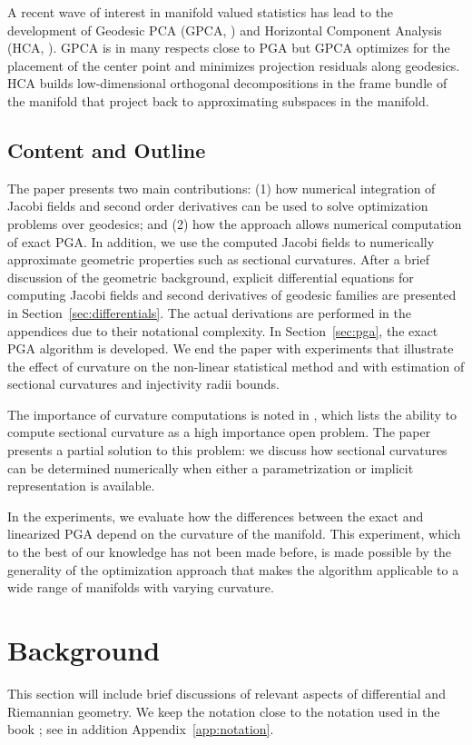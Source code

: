 \documentclass[final]{svjour3}
\begin{document}
A recent wave of interest in manifold valued statistics 
has lead to the development of Geodesic PCA (GPCA, 
\cite{huckemann_intrinsic_2010})
and Horizontal Component Analysis (HCA, \cite{sommer_horizontal_2013}).
GPCA is in many respects close to PGA but
GPCA optimizes for the placement of the center point
and minimizes projection residuals along geodesics. HCA builds low-dimensional orthogonal
decompositions in the frame bundle of the manifold that project back to
approximating subspaces in the manifold.

\subsection{Content and Outline}
The paper presents two main contributions: (1) how numerical integration of 
Jacobi fields and second order derivatives can be used to solve optimization problems over
geodesics; and (2) how the approach allows numerical computation of exact PGA. In addition,
we use the computed Jacobi fields to numerically approximate 
geometric properties such as sectional curvatures.
After a brief discussion of the geometric background, explicit differential equations
for computing Jacobi fields and second derivatives of geodesic families are
presented in Section~\ref{sec:differentials}.
The actual derivations are performed in the appendices due to
their notational complexity. In Section~\ref{sec:pga}, the
exact PGA algorithm is developed. We end the paper with experiments that
illustrate the effect of curvature on the non-linear statistical method 
and with estimation of sectional curvatures and injectivity radii bounds.

The importance of curvature computations is noted in
\cite{huckemann_intrinsic_2010}, which lists the ability to compute sectional
curvature as a high importance open problem. The paper presents a partial
solution to this problem: we discuss how sectional curvatures can be determined
numerically when either a parametrization or implicit representation is available.

In the experiments, we evaluate how the differences between the exact
and linearized PGA depend on
the curvature of the manifold. This experiment, which to the best of our
knowledge has not been made before, is made possible by the
generality of the optimization approach that makes the algorithm 
applicable to a wide range of manifolds with varying curvature.

\section{Background}
\label{sec:geom-notation}
This section will include brief discussions of relevant aspects 
of differential and Riemannian geometry. We keep the notation close to the
notation used in the book \cite{do_carmo_riemannian_1992}; 
see in addition Appendix~\ref{app:notation}.
\end{document}
